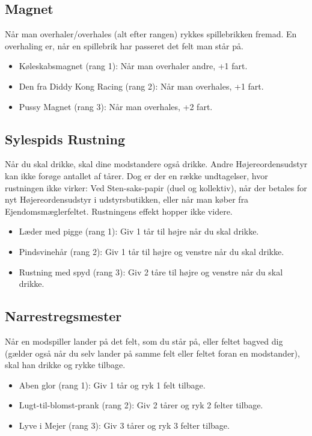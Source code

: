 \documentclass{article}
\begin{document}
\subsection{Magnet}
Når man overhaler/overhales (alt efter rangen) rykkes spillebrikken fremad. En overhaling er, når en spillebrik har passeret det felt man står på.

\begin{itemize}
	\item Køleskabsmagnet (rang 1): Når man overhaler andre, +1 fart.
	\item Den fra Diddy Kong Racing (rang 2): Når man overhales, +1 fart.
	\item Pussy Magnet (rang 3): Når man overhales, +2 fart.
\end{itemize}
 
\subsection{Sylespids Rustning}
Når du skal drikke, skal dine modstandere også drikke. Andre Højereordensudstyr kan ikke forøge antallet af tårer. Dog er der en række undtagelser, hvor rustningen ikke virker: Ved Sten-saks-papir (duel og kollektiv), når der betales for nyt Højereordensudstyr i udstyrsbutikken, eller når man køber fra Ejendomsmæglerfeltet. Rustningens effekt hopper ikke videre.

\begin{itemize}
	\item Læder med pigge (rang 1): Giv 1 tår til højre når du skal drikke.
	\item Pindsvinehår (rang 2): Giv 1 tår til højre og venstre når du skal drikke.
	\item Rustning med spyd (rang 3): Giv 2 tåre til højre og venstre når du skal drikke.
\end{itemize}
 
\subsection{Narrestregsmester}
Når en modspiller lander på det felt, som du står på, eller feltet bagved dig (gælder også når du selv lander på samme felt eller feltet foran en modstander), skal han drikke og rykke tilbage. 

\begin{itemize}
	\item Aben glor (rang 1): Giv 1 tår og ryk 1 felt tilbage.
	\item Lugt-til-blomst-prank (rang 2): Giv 2 tårer og ryk 2 felter tilbage.
	\item Lyve i Mejer (rang 3): Giv 3 tårer og ryk 3 felter tilbage.
\end{itemize}
 
\end{document}
